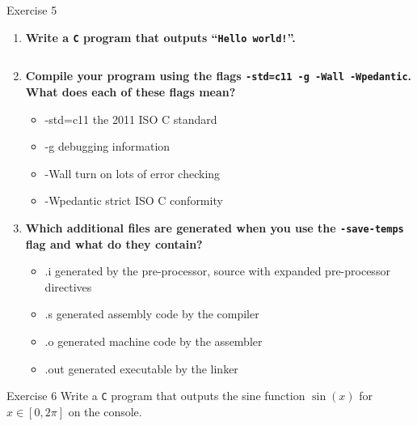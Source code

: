 \documentclass[10pt]{beamer}
\begin{document}
\begin{frame}[allowframebreaks]{Exercise 5}
    \begin{enumerate}
		\item \textbf{Write a \texttt{C} program that outputs ``\texttt{Hello world!}''.} \\ \vspace{1cm}
			\inputminted{c}{code/hello_world.c}
			\framebreak
		\item \textbf{Compile your program using the flags \texttt{-std=c11 -g -Wall -Wpedantic}.
			What does each of these flags mean?}
			\begin{itemize}
			 \item -std=c11 the 2011 ISO C standard
			 \item -g debugging information
			 \item -Wall turn on lots of error checking
			 \item -Wpedantic strict ISO C conformity
			\end{itemize}
			\framebreak
		\item \textbf{Which additional files are generated when you use the \texttt{-save-temps} flag and what do they contain?}
		\begin{itemize}
		 \item .i generated by the pre-processor, source with expanded pre-processor directives
		 \item .s generated assembly code by the compiler
		 \item .o generated machine code by the assembler
		 \item .out generated executable by the linker
		\end{itemize}
	\end{enumerate}
	

\end{frame}

\begin{frame}[allowframebreaks]{Exercise 6}
    Write a \texttt{C} program that outputs the sine function $\sin(x)$ for $x \in [0,2\pi]$ on the console.
    \framebreak
    \begin{mdframed}[linecolor=black, topline=false, bottomline=false,
  leftline=false, rightline=false, backgroundcolor=lg]
    \inputminted[fontsize=\tiny, linenos, frame=lines]{c}{code/sin.c}
\end{mdframed}
    \framebreak
    \begin{mdframed}[linecolor=black, topline=false, bottomline=false,
  leftline=false, rightline=false, backgroundcolor=lg]
    \inputminted[fontsize=\tiny, linenos, frame=lines]{c}{code/sin-alt.c}
\end{mdframed}
\end{frame}
    
\end{document}
